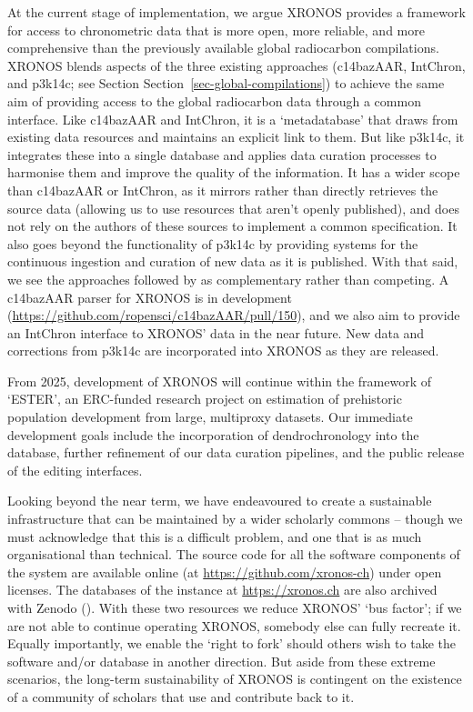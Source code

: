 \documentclass[
  number,
  doubleblind]{elsarticle}
\begin{document}
At the current stage of implementation, we argue XRONOS provides a
framework for access to chronometric data that is more open, more
reliable, and more comprehensive than the previously available global
radiocarbon compilations. XRONOS blends aspects of the three existing
approaches (c14bazAAR, IntChron, and p3k14c; see Section
Section~\ref{sec-global-compilations}) to achieve the same aim of
providing access to the global radiocarbon data through a common
interface. Like c14bazAAR and IntChron, it is a `metadatabase' that
draws from existing data resources and maintains an explicit link to
them. But like p3k14c, it integrates these into a single database and
applies data curation processes to harmonise them and improve the
quality of the information. It has a wider scope than c14bazAAR or
IntChron, as it mirrors rather than directly retrieves the source data
(allowing us to use resources that aren't openly published), and does
not rely on the authors of these sources to implement a common
specification. It also goes beyond the functionality of p3k14c by
providing systems for the continuous ingestion and curation of new data
as it is published. With that said, we see the approaches followed by as
complementary rather than competing. A c14bazAAR parser for XRONOS is in
development (\url{https://github.com/ropensci/c14bazAAR/pull/150}), and
we also aim to provide an IntChron interface to XRONOS' data in the near
future. New data and corrections from p3k14c are incorporated into
XRONOS as they are released.

From 2025, development of XRONOS will continue within the framework of
`ESTER', an ERC-funded research project on estimation of prehistoric
population development from large, multiproxy datasets. Our immediate
development goals include the incorporation of dendrochronology into the
database, further refinement of our data curation pipelines, and the
public release of the editing interfaces.

Looking beyond the near term, we have endeavoured to create a
sustainable infrastructure that can be maintained by a wider scholarly
commons -- though we must acknowledge that this is a difficult problem,
and one that is as much organisational than technical. The source code
for all the software components of the system are available online (at
\url{https://github.com/xronos-ch}) under open licenses. The databases
of the instance at \url{https://xronos.ch} are also archived with Zenodo
(). With these two resources we reduce XRONOS' `bus factor'; if we are
not able to continue operating XRONOS, somebody else can fully recreate
it. Equally importantly, we enable the `right to fork' should others
wish to take the software and/or database in another direction. But
aside from these extreme scenarios, the long-term sustainability of
XRONOS is contingent on the existence of a community of scholars that
use and contribute back to it.
\end{document}
